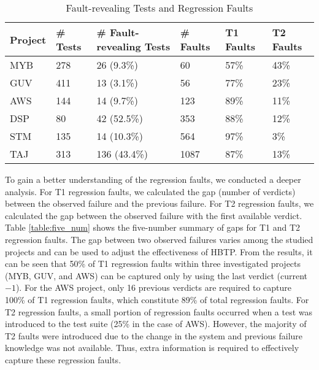\documentclass[1p]{elsarticle}
\begin{document}
\begin{table}[H]
\centering
\caption {Fault-revealing Tests and Regression Faults}
\label{table:fault_char}
\begin{tabular}{|l|l|l|l|l|l|}
\hline                       
 Project & \# Tests & \# Fault-revealing Tests & \# Faults & T1 Faults & T2 Faults \\
\hline
\hline 
MYB & 278 & 26 (9.3\%) & 60 & 57\% & 43\% \\
\hline  
GUV & 411 & 13 (3.1\%) & 56 & 77\% & 23\% \\
\hline
AWS & 144 & 14 (9.7\%) & 123 & 89\% & 11\% \\
\hline
DSP & 80 & 42 (52.5\%) & 353 & 88\% & 12\% \\
\hline
STM & 135 & 14 (10.3\%) & 564 & 97\% & 3\% \\
\hline
TAJ & 313 & 136 (43.4\%) & 1087 & 87\% & 13\% \\
\hline
\end{tabular}
\end{table}


To gain a better understanding of the regression faults, we conducted a deeper analysis. For T1 regression faults, we calculated the gap (number of verdicts) between the observed failure and the previous failure. For T2 regression faults, we calculated the gap between the observed failure with the first available verdict. Table \ref{table:five_num} shows the five-number summary of gaps for T1 and T2 regression faults. The gap between two observed failures varies among the studied projects and can be used to adjust the effectiveness of HBTP. From the results, it can be seen that 50\% of T1 regression faults within three investigated projects (MYB, GUV, and AWS) can be captured only by using the last verdict (current$-1$). For the AWS project, only 16 previous verdicts are required to capture 100\% of T1 regression faults, which constitute 89\% of total regression faults. For T2 regression faults, a small portion of regression faults occurred when a test was introduced to the test suite (25\% in the case of AWS). However, the majority of T2 faults were introduced due to the change in the system and previous failure knowledge was not available. Thus, extra information is required to effectively capture these regression faults.
\end{document}
